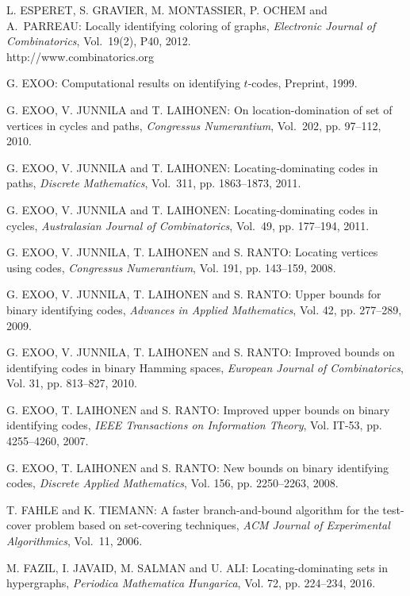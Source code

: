 \begin{thebibliography}{999}
L. ESPERET, S. GRAVIER, M. MONTASSIER, P. OCHEM and A.~PARREAU: Locally identifying coloring of graphs, {\it Electronic Journal of Combinatorics}, Vol.~19(2), P40, 2012.\\
http://www.combinatorics.org

G. EXOO: Computational results on identifying $t$-codes, Preprint, 1999.

G. EXOO, V. JUNNILA and T. LAIHONEN: On location-domination of set of vertices in cycles and paths, %
{\it Congressus Numerantium}, Vol.~202, pp. 97--112, 2010.

G. EXOO, V. JUNNILA and T. LAIHONEN: Locating-dominating codes in paths, {\it Discrete Mathematics}, Vol.~311, pp. 1863--1873, 2011.

G. EXOO, V. JUNNILA and T. LAIHONEN: Locating-dominating codes in cycles, {\it Australasian Journal of Combinatorics}, Vol.~49, pp. 177--194, 2011.

G. EXOO, V. JUNNILA, T. LAIHONEN and S. RANTO: Locating vertices using codes, {\it Congressus Numerantium}, Vol. 191, pp. 143--159, 2008.

G. EXOO, V. JUNNILA, T. LAIHONEN and S. RANTO: Upper bounds for binary identifying codes, {\it Advances in Applied Mathematics}, Vol. 42, pp. 277--289, 2009.

G. EXOO, V. JUNNILA, T. LAIHONEN and S. RANTO: Improved bounds on identifying codes in binary Hamming spaces, {\it European Journal of Combinatorics}, Vol. 31, pp. 813--827, 2010.

G. EXOO, T. LAIHONEN and S. RANTO: Improved upper bounds on binary identifying codes, {\it IEEE Transactions on Information Theory}, Vol. IT-53, pp. 4255--4260, 2007.

G. EXOO, T. LAIHONEN and S. RANTO: New bounds on binary identifying codes, {\it Discrete Applied Mathematics}, Vol. 156, pp. 2250--2263, 2008.

T. FAHLE and K. TIEMANN: A faster branch-and-bound algorithm for the test-cover problem based on set-covering techniques, {\it ACM Journal of Experimental Algorithmics}, Vol.~11, 2006.

M. FAZIL, I. JAVAID, M. SALMAN and U. ALI: Locating-dominating sets in hypergraphs, {\it Periodica Mathematica Hungarica}, Vol. 72,  pp. 224--234, 2016.


\end{thebibliography}

